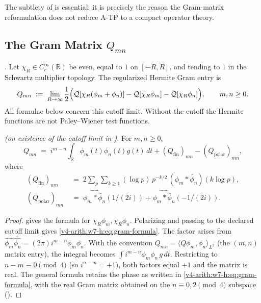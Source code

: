 The subtlety of  is essential:
it is precisely the reason the Gram-matrix reformulation does not
reduce A-TP to a compact operator theory.

\subsection{The Gram Matrix \(Q_{mn}\)}
\label{v4-arith:w7-h:hermite-basis:gram}

\begin{definition}
\label{v4-arith:w7-h:def:gram}
\ClaimStatusDefinitional. Let \(\chi_{R}\in C_{c}^{\infty}(\mathbb R)\)
be even, equal to \(1\) on \([-R,R]\), and tending to \(1\) in the
Schwartz multiplier topology. The regularized Hermite Gram entry is
\begin{equation}
\label{v4-arith:w7-h:eq:gram-definition}
Q_{mn}\;:=\;\lim_{R\to\infty}
\frac{1}{2}\Bigl(\mathcal{Q}[\chi_{R}(\phi_{m}+\phi_{n})]
-\mathcal{Q}[\chi_{R}\phi_{m}]-\mathcal{Q}[\chi_{R}\phi_{n}]\Bigr),
\qquad m,n\geq 0.
\end{equation}
All formulae below concern this cutoff limit. Without the cutoff the
Hermite functions are not Paley--Wiener test functions.
\end{definition}

\begin{theorem}
\label{v4-arith:w7-h:thm:gram-formula}
\ClaimStatusProvedHereConditional \emph{(on existence of the cutoff
limit in )}. For \(m,n\geq 0\),
\begin{equation}
\label{v4-arith:w7-h:eq:gram-formula}
Q_{mn}\;=\;i^{m-n}\!\int_{\mathbb{R}}\phi_{m}(t)\phi_{n}(t)g(t)\,dt+(Q_{\mathrm{fin}})_{mn}-(Q_{\mathrm{polar}})_{mn},
\end{equation}
where
\begin{align}
\label{v4-arith:w7-h:eq:gram-fin}
(Q_{\mathrm{fin}})_{mn}&\;=\;2\sum_{p}\sum_{k\geq 1}(\log p)\,p^{-k/2}\,(\phi_{m}*\widetilde{\phi_{n}})(k\log p),\\
\label{v4-arith:w7-h:eq:gram-polar}
(Q_{\mathrm{polar}})_{mn}&\;=\;\widehat{\phi_{m}*\widetilde{\phi_{n}}}(1/(2i))+\widehat{\phi_{m}*\widetilde{\phi_{n}}}(-1/(2i)).
\end{align}
\end{theorem}

\begin{proof}
 gives the formula for
\(\chi_{R}\phi_m,\chi_R\phi_n\). Polarizing and passing to the
declared cutoff limit gives
\eqref{v4-arith:w7-h:eq:gram-formula}. The factor arises from
\(\widehat{\phi_{m}}\overline{\widehat{\phi_{n}}}
=(2\pi)i^{m-n}\phi_{m}\phi_{n}\).
With the convention \(Q_{mn}=\langle Q\phi_{m},\phi_{n}\rangle_{L^{2}}\)
(the \((m,n)\) matrix entry), the integral becomes
\(\int i^{m-n}\phi_{m}\phi_{n}\,g\,dt\).
Restricting to \(n-m\equiv 0\pmod{4}\)
(so \(i^{n-m}=+1\)), both factors equal \(+1\) and the matrix is real.
The general formula retains the phase as written in
\eqref{v4-arith:w7-h:eq:gram-formula}, with the real Gram matrix
obtained on the \(n\equiv 0,2\pmod{4}\) subspace
().
\end{proof}

